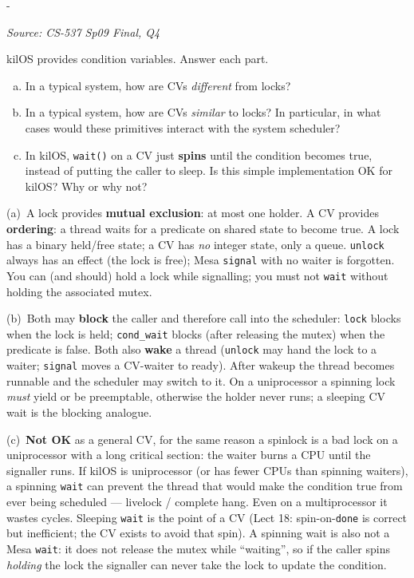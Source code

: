 \documentclass[11pt,a4paper]{article}
\makeatletter
\newcommand{\keepspace}[1]{\par\penalty-100\begingroup
  \setlength{\dimen@}{#1}\dimen@ii\pagegoal\advance\dimen@ii-\pagetotal
  \ifdim\dimen@>\dimen@ii\ifdim\dimen@ii>\z@\vfil\fi\break\fi\endgroup}
\newcounter{qn}[section]
\newenvironment{Qn}[4]{%
  \refstepcounter{qn}\keepspace{7\baselineskip}%
  \begin{tcolorbox}[qboxstyle, title={Q\thesection.\theqn\ \ [#1 \textbar\ #2]\ \ #4}]%
  {\footnotesize\color{g3}\textit{Source: #3}}\par\smallskip%
}{%
  \end{tcolorbox}%
}
\newenvironment{Sol}{%
  \begin{tcolorbox}[sboxstyle, title={Solution}]%
}{%
  \end{tcolorbox}\vspace{0.35em}%
}
\makeatother
\begin{document}
\begin{Qn}{Medium}{Lect 18}{CS-537 Sp09 Final, Q4}{kilOS condition variables: vs.\ locks, vs.\ the scheduler, vs.\ spinning}
kilOS provides condition variables. Answer each part.
\begin{enumerate}[(a)]
\item In a typical system, how are CVs \emph{different} from locks?
\item In a typical system, how are CVs \emph{similar} to locks? In
      particular, in what cases would these primitives interact with
      the system scheduler?
\item In kilOS, \texttt{wait()} on a CV just \textbf{spins} until the
      condition becomes true, instead of putting the caller to sleep.
      Is this simple implementation OK for kilOS? Why or why not?
\end{enumerate}
\end{Qn}
\begin{Sol}
(a)~A lock provides \textbf{mutual exclusion}: at most one holder.
A CV provides \textbf{ordering}: a thread waits for a predicate on
shared state to become true. A lock has a binary held/free state; a
CV has \emph{no} integer state, only a queue. \texttt{unlock} always
has an effect (the lock is free); Mesa \texttt{signal} with no waiter
is forgotten. You can (and should) hold a lock while signalling; you
must not \texttt{wait} without holding the associated mutex.

(b)~Both may \textbf{block} the caller and therefore call into the
scheduler: \texttt{lock} blocks when the lock is held;
\texttt{cond\_wait} blocks (after releasing the mutex) when the
predicate is false. Both also \textbf{wake} a thread
(\texttt{unlock} may hand the lock to a waiter; \texttt{signal}
moves a CV-waiter to ready). After wakeup the thread becomes
runnable and the scheduler may switch to it. On a uniprocessor a
spinning lock \emph{must} yield or be preemptable, otherwise the
holder never runs; a sleeping CV wait is the blocking analogue.

(c)~\textbf{Not OK} as a general CV, for the same reason a spinlock
is a bad lock on a uniprocessor with a long critical section: the
waiter burns a CPU until the signaller runs. If kilOS is
uniprocessor (or has fewer CPUs than spinning waiters), a spinning
\texttt{wait} can prevent the thread that would make the condition
true from ever being scheduled --- livelock / complete hang. Even
on a multiprocessor it wastes cycles. Sleeping \texttt{wait} is the
point of a CV (Lect 18: spin-on-\texttt{done} is correct but
inefficient; the CV exists to avoid that spin). A spinning wait
is also not a Mesa \texttt{wait}: it does not release the mutex
while ``waiting'', so if the caller spins \emph{holding} the lock
the signaller can never take the lock to update the condition.
\end{Sol}
\end{document}
